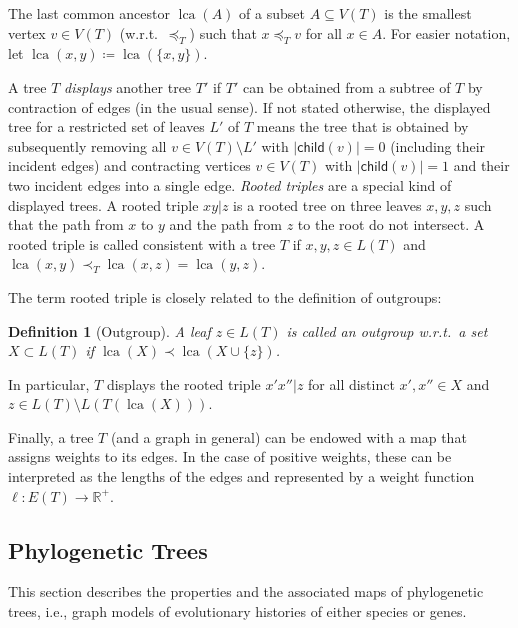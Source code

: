 \documentclass[hidelinks,11pt]{scrreprt}
\DeclareMathOperator{\lca}{lca}
\newtheorem{definition}[theorem]{Definition}
\newcommand{\child}{\mathsf{child}}
\begin{document}
The last common ancestor $\lca(A)$ of a subset $A \subseteq V(T)$ is the smallest vertex $v \in V(T)$ (w.r.t.\ $\preceq_T$) such that $x \preceq_T v$ for all $x \in A$. For easier notation, let $\lca(x,y) \coloneqq \lca(\{x,y\})$.

A tree $T$ \textit{displays} another tree $T'$ if $T'$ can be obtained from a subtree of $T$ by contraction of edges (in the usual sense).
If not stated otherwise, the displayed tree for a restricted set of leaves $L'$ of $T$ means the tree that is obtained by subsequently  removing all $v \in V(T) \setminus L'$ with $|\child(v)| = 0$ (including their incident edges) and contracting vertices $v \in V(T)$ with $|\child(v)| = 1$ and their two incident edges into a single edge. \emph{Rooted triples} are a special kind of displayed trees. A rooted triple $xy|z$ is a rooted tree on three leaves $x,y,z$ such that the path from $x$ to $y$ and the path from $z$ to the root do not intersect.
A rooted triple is called consistent with a tree $T$ if $x,y,z \in L(T)$ and $\lca(x,y) \prec_T \lca(x,z) = \lca(y,z)$.

The term rooted triple is closely related to the definition of outgroups:

\begin{definition}[Outgroup]
	\label{def:outgroup}
	A leaf $z\in L(T)$ is called an \emph{outgroup} w.r.t.\ a set $X \subset L(T)$ if $\lca(X) \prec \lca(X \cup \{z\})$.
\end{definition}

In particular, $T$ displays the rooted triple $x'x''|z$ for all distinct $x',x''\in X$ and $z \in L(T) \setminus L(T(\lca(X)))$.

Finally, a tree $T$ (and a graph in general) can be endowed with a map that assigns weights to its edges. In the case of positive weights, these can be interpreted as the lengths of the edges and represented by a weight function $\ell\colon E(T) \to \mathbb{R}^+$.

\subsection{Phylogenetic Trees}
\label{sec:phylogenetic_trees}

This section describes the properties and the associated maps of phylogenetic trees, i.e., graph models of evolutionary histories of either species or genes.
\end{document}
